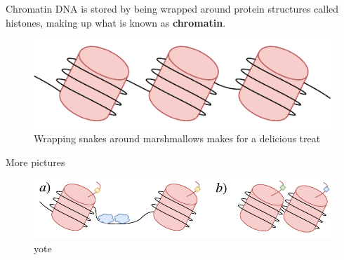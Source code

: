 \documentclass{beamer}
\begin{document}
    \begin{frame}{Chromatin}
        DNA is stored by being wrapped around protein structures called histones, making up what is known as \textbf{chromatin}.
        \begin{figure}
            \centering
            \includegraphics{Chromatin.pdf}
            \caption{Wrapping snakes around marshmallows makes for a delicious treat}
            \label{fig:chromatin}
        \end{figure}
    \end{frame}
    
    \begin{frame}{More pictures}
        \begin{figure}
            \centering
            \includegraphics[width = \textwidth]{OpenCloseChromatinEpi.pdf}
            \caption{yote}
            \label{fig:yote}
        \end{figure}
    \end{frame}
    
\end{document}

